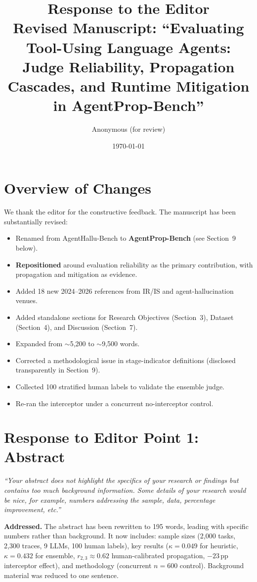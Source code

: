 \documentclass[11pt]{article}
\title{Response to the Editor\\[0.5em]
\large Revised Manuscript: ``Evaluating Tool-Using Language Agents:\\
Judge Reliability, Propagation Cascades, and Runtime Mitigation\\
in AgentProp-Bench''}
\author{Anonymous (for review)}
\date{\today}
\newcommand{\editortext}[1]{\textit{\color{gray}#1}}
\begin{document}
\maketitle

\section{Overview of Changes}

We thank the editor for the constructive feedback. The manuscript has been
substantially revised:

\begin{itemize}[nosep]
  \item Renamed from AgentHallu-Bench to \textbf{AgentProp-Bench} (see Section~9 below).
  \item \textbf{Repositioned} around evaluation reliability as the primary
        contribution, with propagation and mitigation as evidence.
  \item Added 18 new 2024--2026 references from IR/IS and agent-hallucination venues.
  \item Added standalone sections for Research Objectives (Section~3),
        Dataset (Section~4), and Discussion (Section~7).
  \item Expanded from $\sim$5,200 to $\sim$9,500 words.
  \item Corrected a methodological issue in stage-indicator definitions
        (disclosed transparently in Section~9).
  \item Collected 100 stratified human labels to validate the ensemble judge.
  \item Re-ran the interceptor under a concurrent no-interceptor control.
\end{itemize}

\section{Response to Editor Point 1: Abstract}

\editortext{``Your abstract does not highlight the specifics of your
research or findings but contains too much background information.
Some details of your research would be nice, for example, numbers
addressing the sample, data, percentage improvement, etc.''}

\textbf{Addressed.} The abstract has been rewritten to 195 words, leading
with specific numbers rather than background. It now includes:
sample sizes (2,000 tasks, 2,300 traces, 9 LLMs, 100 human labels),
key results ($\kappa=0.049$ for heuristic, $\kappa=0.432$ for ensemble,
$r_{2,3}\approx 0.62$ human-calibrated propagation, $-23$\,pp interceptor
effect), and methodology (concurrent $n{=}600$ control). Background material
was reduced to one sentence.
\end{document}
